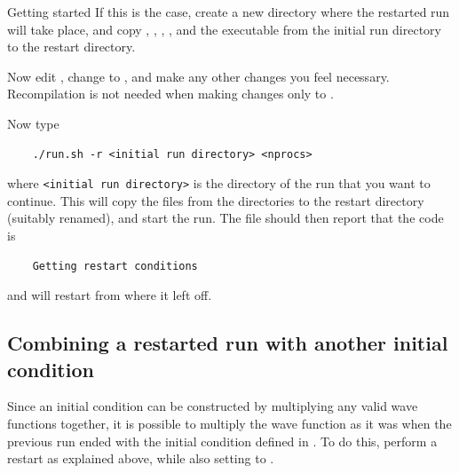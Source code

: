 \begin{chapter}{\label{cha:quickstart}Getting started}
  If this is the case, create a new directory where the restarted run will take
  place, and copy , , ,
  , and the executable  from the initial run
  directory to the restart directory.

  Now edit , change  to , and
  make any other changes you feel necessary.  Recompilation is not needed when
  making changes only to .

  Now type
  \begin{Verbatim}
    ./run.sh -r <initial run directory> <nprocs>
  \end{Verbatim}
  where \verb"<initial run directory>" is the directory of the run that you
  want to continue.  This will copy the  files from the
   directories to the restart directory (suitably renamed), and
  start the run.  The  file should then report that the code
  is
  \begin{Verbatim}
    Getting restart conditions
  \end{Verbatim}
  and will restart from where it left off.

  \subsection{\label{subsec:multiply_ic_restart}Combining a restarted run with
      another initial condition}
  Since an initial condition can be constructed by multiplying any valid wave
  functions together, it is possible to multiply the wave function as it was
  when the previous run ended with the initial condition defined in
  .  To do this, perform a restart as explained above, while
  also setting  to .
\end{chapter}
